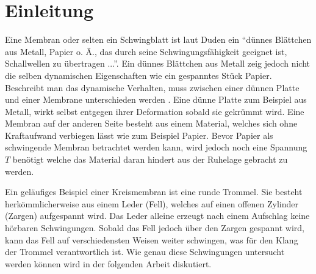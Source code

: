%
%
%
\section{Einleitung\label{kreismembran:section:teil0}}
Eine Membran oder selten ein Schwingblatt ist laut Duden \cite{kreismembran:Duden:Membran} ein ``dünnes Blättchen aus Metall, Papier o. Ä., das durch seine Schwingungsfähigkeit geeignet ist, Schallwellen zu übertragen ...''. 
Ein dünnes Blättchen aus Metall zeig jedoch nicht die selben dynamischen Eigenschaften wie ein gespanntes Stück Papier. 
Beschreibt man das dynamische Verhalten, muss zwischen einer dünnen Platte und einer Membrane unterschieden werden \cite{kreismembran:membrane_vs_thin_plate}. 
Eine dünne Platte zum Beispiel aus Metall, wirkt selbst entgegen ihrer Deformation sobald sie gekrümmt wird. 
Eine Membran auf der anderen Seite besteht aus einem Material, welches sich ohne Kraftaufwand verbiegen lässt wie zum Beispiel Papier. 
Bevor Papier als schwingende Membran betrachtet werden kann, wird jedoch noch eine Spannung $ T $ benötigt welche das Material daran hindert aus der Ruhelage gebracht zu werden. 

Ein geläufiges Beispiel einer Kreismembran ist eine runde Trommel. 
Sie besteht herkömmlicherweise aus einem Leder (Fell), welches auf einen offenen Zylinder (Zargen) aufgespannt wird. 
Das Leder alleine erzeugt nach einem Aufschlag keine hörbaren Schwingungen. 
Sobald das Fell jedoch über den Zargen gespannt wird, kann das Fell auf verschiedensten Weisen weiter schwingen, was für den Klang der Trommel verantwortlich ist. 
Wie genau diese Schwingungen untersucht werden können wird in der folgenden Arbeit diskutiert.
	

